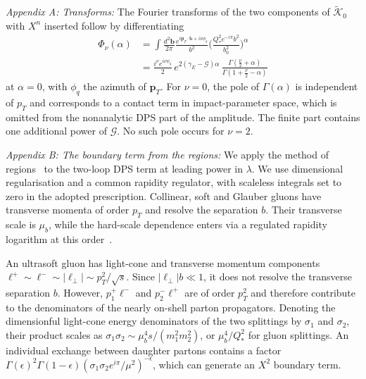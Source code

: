 \documentclass[%
 twocolumn,
 superscriptaddress,
 preprintnumbers,
 nofootinbib,
 amsmath,amssymb,
 aps,
 prl,
]{revtex4-2}
\newcommand{\G}{\mathcal G}
\newcommand{\bb}{\boldsymbol b}
\newcommand{\Kt}{\widetilde{\mathcal K}}
\begin{document}

\textit{Appendix A: Transforms:} The Fourier transforms of the two components of $\Kt_0$ with
$X^n$ inserted follow by differentiating
\begin{equation}
\begin{aligned}
\Phi_\nu(\alpha)&=\int\!\frac{d^2\bb}{2\pi}\frac{e^{i\boldsymbol p_T\cdot\bb+i\nu\phi_b}}{b^2}
\Big(\frac{Q_*^2e^{-i\pi}b^2}{b_0^2}\Big)^{\!\alpha}\\
&=\frac{i^\nu e^{i\nu\phi_q}}{2}\,e^{2(\gamma_E-\G)\alpha}\,
\frac{\Gamma(\frac\nu2+\alpha)}{\Gamma(1+\frac\nu2-\alpha)}
\end{aligned}
\label{eq:Fm}
\end{equation}
at $\alpha=0$, with $\phi_q$ the azimuth of
$\boldsymbol p_T$. For $\nu=0$, the pole of
$\Gamma(\alpha)$ is independent of $p_T$ and
corresponds to a contact term in impact-parameter
space, which is omitted from the nonanalytic
DPS part of the amplitude.
The finite part contains one additional power of $\G$.
No such pole occurs for $\nu=2$.





\textit{Appendix B: The boundary term from the regions:}
We apply the method of regions~\cite{Beneke:1997zp}
to the two-loop DPS term at leading power in $\lambda$.
We use dimensional regularisation and a common
rapidity regulator, with scaleless integrals set to
zero in the adopted prescription. Collinear, soft
and Glauber gluons have transverse momenta of order
$p_T$ and resolve the separation $b$. Their transverse
scale is $\mu_b$, while the hard-scale dependence
enters via a regulated rapidity logarithm at
this order~\cite{Chiu:2012ir}.

An ultrasoft gluon has light-cone and transverse
momentum components
$\ell^+\sim\ell^-\sim|\boldsymbol\ell_\perp|
\sim p_T^2/\sqrt{s}$.
Since $|\boldsymbol\ell_\perp|b\ll1$,
it does not resolve the transverse separation $b$.
However, $p_1^+\ell^-$ and $p_2^-\ell^+$
are of order $p_T^2$ and therefore contribute
to the denominators of the nearly on-shell
parton propagators.
Denoting the dimensionful
light-cone energy denominators of the two splittings
by $\sigma_1$ and $\sigma_2$, their product scales as
$\sigma_1\sigma_2\sim\mu_b^4s/(m_1^2m_2^2)$, or
$\mu_b^4/Q_*^2$ for gluon splittings.
An individual exchange between daughter partons
contains a factor
$\Gamma(\epsilon)^2\Gamma(1-\epsilon)
(\sigma_1\sigma_2e^{i\pi}/\mu^2)^{-\epsilon}$,
which can generate an $X^2$ boundary term.
\end{document}
